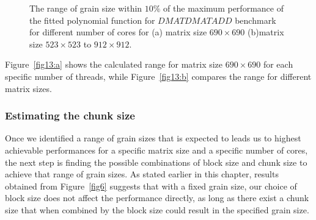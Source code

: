 \begin{figure}[H]
	\centering
	\caption{The range of grain size within $10\%$ of the maximum performance of the fitted polynomial function for $DMATDMATADD$ benchmark for different number of cores for (a) matrix size $690\times690$ (b)matrix size $523\times523$ to $912\times912$.}	
	\label{fig13}
\end{figure}



Figure~\ref{fig13:a} shows the calculated range for matrix size $690\times690$ for each specific number of threads, while Figure~\ref{fig13:b} compares the range for different matrix sizes. 
\vspace{\baselineskip}	

\subsubsection{Estimating the chunk size}
Once we identified a range of grain sizes that is expected to leads us to highest achievable performances for a specific matrix size and a specific number of cores, the next step is finding the possible combinations of block size and chunk size to achieve that range of grain sizes.  
As stated earlier in this chapter, results obtained from Figure~\ref{fig6} suggests that with a fixed grain size, our choice of block size does not affect the performance directly, as long as there exist a chunk size that when combined by the block size could result in the specified grain size. 

